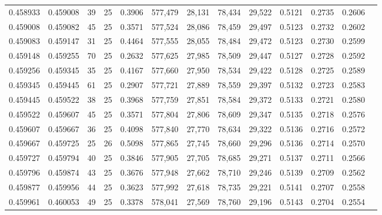 \begin{tabular}{rrrrrrrrrrrrr}
0.458933 & 0.459008 &    39 &  25 &                                     0.3906 & 577,479 &  28,131 &  78,434 &  29,522 & 0.5121 & 0.2735 & 0.2606 \\
0.459008 & 0.459082 &    45 &  25 &                                     0.3571 & 577,524 &  28,086 &  78,459 &  29,497 & 0.5123 & 0.2732 & 0.2602 \\
0.459083 & 0.459147 &    31 &  25 &                                     0.4464 & 577,555 &  28,055 &  78,484 &  29,472 & 0.5123 & 0.2730 & 0.2599 \\
0.459148 & 0.459255 &    70 &  25 &                                     0.2632 & 577,625 &  27,985 &  78,509 &  29,447 & 0.5127 & 0.2728 & 0.2592 \\
0.459256 & 0.459345 &    35 &  25 &                                     0.4167 & 577,660 &  27,950 &  78,534 &  29,422 & 0.5128 & 0.2725 & 0.2589 \\
0.459345 & 0.459445 &    61 &  25 &                                     0.2907 & 577,721 &  27,889 &  78,559 &  29,397 & 0.5132 & 0.2723 & 0.2583 \\
0.459445 & 0.459522 &    38 &  25 &                                     0.3968 & 577,759 &  27,851 &  78,584 &  29,372 & 0.5133 & 0.2721 & 0.2580 \\
0.459522 & 0.459607 &    45 &  25 &                                     0.3571 & 577,804 &  27,806 &  78,609 &  29,347 & 0.5135 & 0.2718 & 0.2576 \\
0.459607 & 0.459667 &    36 &  25 &                                     0.4098 & 577,840 &  27,770 &  78,634 &  29,322 & 0.5136 & 0.2716 & 0.2572 \\
0.459667 & 0.459725 &    25 &  26 &                                     0.5098 & 577,865 &  27,745 &  78,660 &  29,296 & 0.5136 & 0.2714 & 0.2570 \\
0.459727 & 0.459794 &    40 &  25 &                                     0.3846 & 577,905 &  27,705 &  78,685 &  29,271 & 0.5137 & 0.2711 & 0.2566 \\
0.459796 & 0.459874 &    43 &  25 &                                     0.3676 & 577,948 &  27,662 &  78,710 &  29,246 & 0.5139 & 0.2709 & 0.2562 \\
0.459877 & 0.459956 &    44 &  25 &                                     0.3623 & 577,992 &  27,618 &  78,735 &  29,221 & 0.5141 & 0.2707 & 0.2558 \\
0.459961 & 0.460053 &    49 &  25 &                                     0.3378 & 578,041 &  27,569 &  78,760 &  29,196 & 0.5143 & 0.2704 & 0.2554 \\

\end{tabular}
